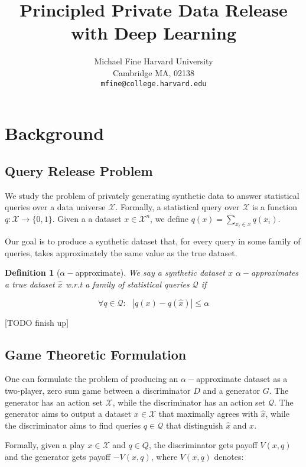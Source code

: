 \documentclass[]{article}
\author{%
  Michael Fine
  Harvard University\\
  Cambridge MA, 02138 \\
  \texttt{mfine@college.harvard.edu} 
}
\title{Principled Private Data Release with Deep Learning}
\newcommand{\X}{\mathcal{X}}
\newcommand{\Q}{\mathcal{Q}}
\newcommand{\B}{\{0,1\}}
\newtheorem{definition}{Definition}
\begin{document}
\maketitle



\section{Background}

\subsection{Query Release Problem}

We study the problem of privately generating synthetic data to answer statistical queries over a data universe $\X$. Formally, a statistical query over $\X$ is a function $q: \X \to \B$. Given a a dataset $x \in \X^n$, we define $q(x) = \sum_{x_i \in x} q(x_i)$.

Our goal is to produce a synthetic dataset that, for every query in some family of queries, takes approximately the same value as the true dataset.

\begin{definition}[$\alpha-$approximate]
    We say a synthetic dataset $x$ $\alpha-$approximates a true dataset $\hat x$ w.r.t a family of statistical queries $\Q$ if

    \begin{equation}
        \forall q \in \Q: ~~~ |q(x) - q(\hat x)| \leq \alpha
    \end{equation}
\end{definition}

[TODO finish up]

\subsection{Game Theoretic Formulation}

One can formulate the problem of producing an $\alpha-$approximate dataset as a two-player, zero sum game \cite{HRU13} between a discriminator $D$ and a generator $G$. The generator has an action set $\X$, while the discriminator has an action set $\Q$. The generator aims to output a dataset $x \in \X$ that maximally agrees with $\hat x$, while the discriminator aims to find queries $q \in \Q$ that distinguish $\hat x$ and $x$.

Formally, given a play $x \in \X$ and $q \in Q$, the discriminator gets payoff $V(x,q)$ and the generator gets payoff $-V(x,q)$, where $V(x,q)$ denotes:
\end{document}
